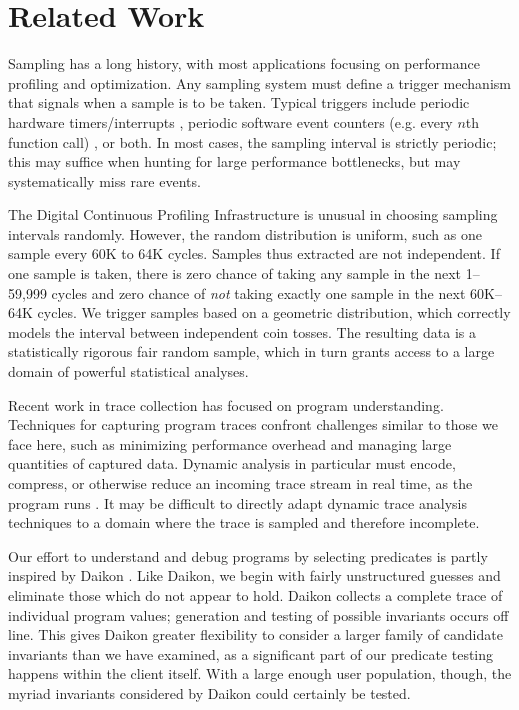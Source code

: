 \section{Related Work}
\label{sec:related-work}

Sampling has a long history, with most applications focusing on
performance profiling and optimization.  Any sampling system must
define a trigger mechanism that signals when a sample is to be taken.
Typical triggers include periodic hardware timers/interrupts
\cite{Burrows:2000:EFV,Traub:200:EILPP,Whaley:337483}, periodic
software event counters (e.g.  every $n$th function call)
\cite{Arnold:2000:ACCTS}, or both.  In most cases, the sampling
interval is strictly periodic; this may suffice when hunting for large
performance bottlenecks, but may systematically miss rare events.

The Digital Continuous Profiling Infrastructure
\cite{Anderson:1997:CPW} is unusual in choosing sampling intervals
randomly.  However, the random distribution is uniform, such as one
sample every 60K to 64K cycles.  Samples thus extracted are not
independent.  If one sample is taken, there is zero chance of taking
any sample in the next 1--59,999 cycles and zero chance of \emph{not}
taking exactly one sample in the next 60K--64K cycles.  We trigger
samples based on a geometric distribution, which correctly models the
interval between independent coin tosses.  The resulting data is a
statistically rigorous fair random sample, which in turn grants access
to a large domain of powerful statistical analyses.

Recent work in trace collection has focused on program understanding.
Techniques for capturing program traces confront challenges similar to
those we face here, such as minimizing performance overhead and
managing large quantities of captured data.  Dynamic analysis in
particular must encode, compress, or otherwise reduce an incoming
trace stream in real time, as the program runs
\cite{Demsky:RBEOOP:2002,ICSE01*221}.  It may be difficult to directly
adapt dynamic trace analysis techniques to a domain where the trace is
sampled and therefore incomplete.  

Our effort to understand and debug programs by selecting predicates is
partly inspired by Daikon \cite{ernst2001}.  Like Daikon, we begin
with fairly unstructured guesses and eliminate those which do not
appear to hold.  Daikon collects a complete trace of individual
program values; generation and testing of possible invariants occurs
off line.  This gives Daikon greater flexibility to consider a
larger family of candidate invariants than we have examined, as a
significant part of our predicate testing happens within the client
itself.  With a large enough user population, though, the myriad
invariants considered by Daikon could certainly be tested.

